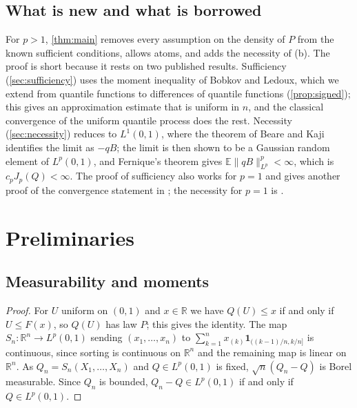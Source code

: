 \documentclass[11pt]{amsart}
\newtheorem{lemma}[theorem]{Lemma}
\theoremstyle{remark}
\newcommand{\R}{\mathbb{R}}
\newcommand{\E}{\mathbb{E}}
\newcommand{\ind}{\mathbf{1}}
\newcommand{\dd}{\,\mathrm{d}}
\newcommand{\Lp}{L^p(0,1)}
\begin{document}
\subsection*{What is new and what is borrowed}
For $p>1$, \cref{thm:main} removes every assumption on the density of $P$ from the known sufficient conditions, allows atoms, and adds the necessity of (b). The proof is short because it rests on two published results. Sufficiency (\cref{sec:sufficiency}) uses the moment inequality of Bobkov and Ledoux, which we extend from quantile functions to differences of quantile functions (\cref{prop:signed}); this gives an approximation estimate that is uniform in $n$, and the classical convergence of the uniform quantile process does the rest. Necessity (\cref{sec:necessity}) reduces to $L^1(0,1)$, where the theorem of Beare and Kaji identifies the limit as $-qB$; the limit is then shown to be a Gaussian random element of $\Lp$, and Fernique's theorem gives $\E\|qB\|_{L^p}^p<\infty$, which is $c_pJ_p(Q)<\infty$. The proof of sufficiency also works for $p=1$ and gives another proof of the convergence statement in \cite[Theorem~3.1]{BeareKaji2025}; the necessity for $p=1$ is \cite[Theorem~3.2]{BeareKaji2025}.

\section{Preliminaries}\label{sec:prelim}

\subsection{Measurability and moments}


\begin{proof}
For $U$ uniform on $(0,1)$ and $x\in\R$ we have $Q(U)\le x$ if and only if $U\le F(x)$, so $Q(U)$ has law $P$; this gives the identity. The map $S_n:\R^n\to\Lp$ sending $(x_1,\dots,x_n)$ to $\sum_{k=1}^n x_{(k)}\ind_{((k-1)/n,k/n]}$ is continuous, since sorting is continuous on $\R^n$ and the remaining map is linear on $\R^n$. As $Q_n=S_n(X_1,\dots,X_n)$ and $Q\in\Lp$ is fixed, $\sqrt n(Q_n-Q)$ is Borel measurable. Since $Q_n$ is bounded, $Q_n-Q\in\Lp$ if and only if $Q\in\Lp$.
\end{proof}
\end{document}
